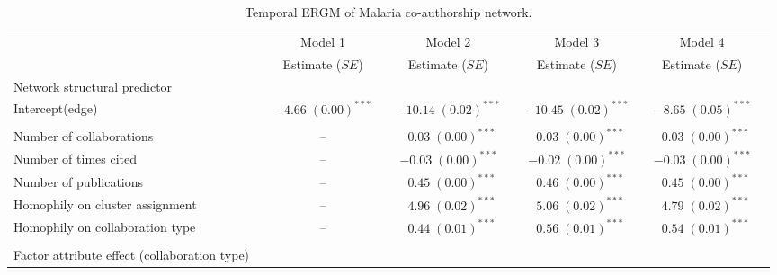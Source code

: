 \begin{table}[!h]
\begin{center}
\caption{Temporal ERGM of Malaria co-authorship network.}
\label{tab:malaria_tergm}
\hspace*{-1cm}
\scriptsize
\begin{tabular}{@{}lcclclclcl@{}}
        \toprule
           &  & Model 1 &  & Model 2  &  & Model 3&  & Model 4\\ \cmidrule{3-3} \cmidrule{5-5} \cmidrule{7-7} \cmidrule{9-9}
           &  & Estimate ($SE$) &  & Estimate ($SE$)  &  & Estimate ($SE$) &  & Estimate ($SE$)\\ 
        \midrule
Network structural predictor & & & & & & & & \\
\hspace{10pt}Intercept(edge)   &  & $-4.66 \; (0.00)^{***}$ &  & $-10.14 \; (0.02)^{***}$ &  & $-10.45 \; (0.02)^{***}$ &  & $-8.65 \; (0.05)^{***}$ \\ \\
Number of collaborations          &  & --  &  & $\hspace{6pt}0.03 \; (0.00)^{***}$  &  & $\hspace{6pt}0.03 \; (0.00)^{***}$  &  & $\hspace{6pt}0.03 \; (0.00)^{***}$  \\
Number of times cited   &  & -- &  & $-0.03 \; (0.00)^{***}$ &  & $-0.02 \; (0.00)^{***}$ &  & $-0.03 \; (0.00)^{***}$ \\
Number of publications  &  & --  &  & $\hspace{6pt}0.45 \; (0.00)^{***}$  &  & $\hspace{6pt}0.46 \; (0.00)^{***}$  &  & $\hspace{6pt}0.45 \; (0.00)^{***}$  \\
Homophily on cluster assignment  &  & --  &  & $\hspace{6pt}4.96 \; (0.02)^{***}$  &  & $\hspace{6pt}5.06 \; (0.02)^{***}$  &  & $\hspace{6pt}4.79 \; (0.02)^{***}$  \\
Homophily on collaboration type   &  & --  &  & $\hspace{6pt}0.44 \; (0.01)^{***}$  &  & $\hspace{6pt}0.56 \; (0.01)^{***}$  &  & $\hspace{6pt}0.54 \; (0.01)^{***}$  \\ \\
Factor attribute effect (collaboration type) & & & & & & & & \\

\end{tabular}
\end{center}
\end{table}
